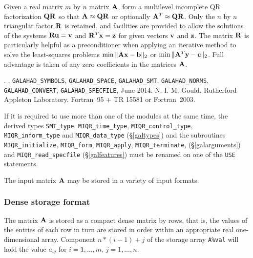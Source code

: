 \documentclass{galahad}
\newcommand{\packagename}{MIQR}
\newcommand{\fullpackagename}{\libraryname\_\packagename}
\begin{document}
\galheader


\galsummary
Given a real matrix $m$ by $n$ matrix ${\mathbf{A}}$, form a multilevel 
incomplete QR factorization ${\mathbf{Q}} {\mathbf{R}}$ so that ${\mathbf{A}} \approx {\mathbf{Q}}{\mathbf{R}}$ or
optionally ${\mathbf{A}}^T \approx {\mathbf{Q}}{\mathbf{R}}$.
Only the $n$ by $n$ triangular factor ${\mathbf{R}}$ is retained, and facilities
are provided to allow the solutions of the systems ${\mathbf{R}} {\mathbf{u}} = {\mathbf{v}}$ and 
${\mathbf{R}}^T {\mathbf{x}} = {\mathbf{z}}$
for given vectors ${\mathbf{v}}$ and ${\mathbf{z}}$. The matrix ${\mathbf{R}}$ is particularly helpful
as a preconditioner when applying an iterative method to solve the
least-squares problems $\min \|{\mathbf{A}}{\mathbf{x}}-{\mathbf{b}}\|_2$ or 
$\min \|{\mathbf{A}}^T{\mathbf{y}}-{\mathbf{c}}\|_2$.
Full advantage is taken of any zero coefficients in the matrices ${\mathbf{A}}$.


\galattributes
\galversions{\tt  \fullpackagename\_single, \fullpackagename\_double}.
,
{\tt GALAHAD\_\-SY\-M\-BOLS}, 
{\tt GALAHAD\-\_SPACE}, 
{\tt GALAHAD\_SMT},
{\tt GALAHAD\_NORMS},
{\tt GALAHAD\_CONVERT},
{\tt GALAHAD\_SPECFILE},
\galdate June 2014.
\galorigin N. I. M. Gould,
Rutherford Appleton Laboratory.
\gallanguage Fortran~95 + TR 15581 or Fortran~2003. 


\galhowto



\noindent
If it is required to use more than one of the modules at the same time, 
the derived types
{\tt SMT\_type}, 
{\tt \packagename\_time\_type}, 
{\tt \packagename\_control\_type}, 
{\tt \packagename\_inform\_type} 
and
{\tt \packagename\_data\_type}
(\S\ref{galtypes})
and the subroutines
{\tt \packagename\_initialize}, 
{\tt \packagename\_\-form},
{\tt \packagename\_\-apply},
{\tt \packagename\_terminate},
(\S\ref{galarguments})
and 
{\tt \packagename\_read\_specfile}
(\S\ref{galfeatures})
must be renamed on one of the {\tt USE} statements.


\galmatrix
The input matrix ${\mathbf{A}}$ may be stored in a variety of input formats.

\subsubsection{Dense storage format}\label{dense}
The matrix ${\mathbf{A}}$ is stored as a compact 
dense matrix by rows, that is, the values of the entries of each row in turn are
stored in order within an appropriate real one-dimensional array.
Component $n \ast (i-1) + j$ of the storage array {\tt A\%val} will hold the 
value $a_{ij}$ for $i = 1, \ldots , m$, $j = 1, \ldots , n$.
\end{document}
